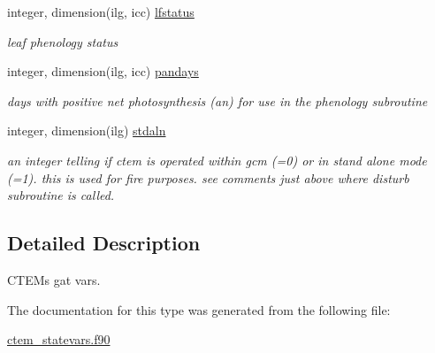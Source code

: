 \begin{DoxyCompactItemize}
\item 
\hypertarget{structctem__statevars_1_1veg__gat_ae8d0dc8bbf1921db0851bfae95d74716}{}integer, dimension(ilg, icc) \hyperlink{structctem__statevars_1_1veg__gat_ae8d0dc8bbf1921db0851bfae95d74716}{lfstatus}\label{structctem__statevars_1_1veg__gat_ae8d0dc8bbf1921db0851bfae95d74716}

\begin{DoxyCompactList}\small\item\em leaf phenology status \end{DoxyCompactList}\item 
\hypertarget{structctem__statevars_1_1veg__gat_a66e9b1908bda5c65e1d62cea368c8615}{}integer, dimension(ilg, icc) \hyperlink{structctem__statevars_1_1veg__gat_a66e9b1908bda5c65e1d62cea368c8615}{pandays}\label{structctem__statevars_1_1veg__gat_a66e9b1908bda5c65e1d62cea368c8615}

\begin{DoxyCompactList}\small\item\em days with positive net photosynthesis (an) for use in the phenology subroutine \end{DoxyCompactList}\item 
\hypertarget{structctem__statevars_1_1veg__gat_ac275495e600c2b8a67b29b7045c725c1}{}integer, dimension(ilg) \hyperlink{structctem__statevars_1_1veg__gat_ac275495e600c2b8a67b29b7045c725c1}{stdaln}\label{structctem__statevars_1_1veg__gat_ac275495e600c2b8a67b29b7045c725c1}

\begin{DoxyCompactList}\small\item\em an integer telling if ctem is operated within gcm (=0) or in stand alone mode (=1). this is used for fire purposes. see comments just above where disturb subroutine is called. \end{DoxyCompactList}\end{DoxyCompactItemize}


\subsection{Detailed Description}
C\+T\+E\+M\textquotesingle{}s \textquotesingle{}gat\textquotesingle{} vars. 

The documentation for this type was generated from the following file\+:\begin{DoxyCompactItemize}
\item 
\hyperlink{ctem__statevars_8f90}{ctem\+\_\+statevars.\+f90}\end{DoxyCompactItemize}
